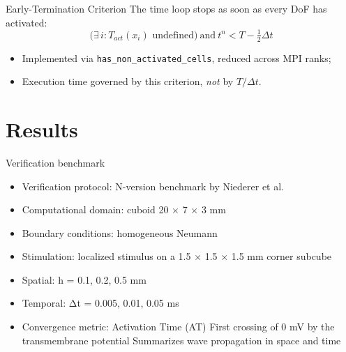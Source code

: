\documentclass{beamer}
\begin{document}
\begin{frame}{Early-Termination Criterion}
The time loop stops as soon as every DoF has activated:
\[
\Big(\exists\, i : T_{act}(x_i) \text{ undefined}\Big) \ \text{and} \ t^n < T - \tfrac{1}{2}\Delta t
\]
\begin{itemize}
  \item Implemented via \texttt{has\_non\_activated\_cells}, reduced across MPI ranks; 
  \item Execution time governed by this criterion, \emph{not} by $T/\Delta t$.
\end{itemize}
\end{frame}


\section{Results}


\begin{frame}{Verification benchmark}
\begin{itemize}
    \item Verification protocol: N-version benchmark by Niederer et al.
    \item Computational domain: cuboid 20 × 7 × 3 mm
    \item Boundary conditions: homogeneous Neumann
    \item Stimulation: localized stimulus on a 1.5 × 1.5 × 1.5 mm corner subcube
    \item Spatial: h = {0.1, 0.2, 0.5} mm
    \item Temporal: Δt = {0.005, 0.01, 0.05} ms
    \item Convergence metric: Activation Time (AT)
    First crossing of 0 mV by the transmembrane potential
    Summarizes wave propagation in space and time
\end{itemize}
\end{frame}
\end{document}
